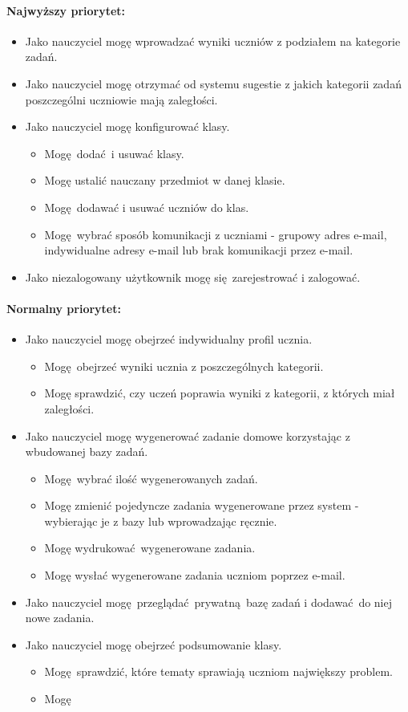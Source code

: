 \documentclass[polish,12pt]{aghthesis}
\begin{document}
\paragraph{Najwyższy priorytet:}
\begin{itemize}
	\item Jako nauczyciel mogę wprowadzać wyniki uczniów z podziałem na kategorie zadań.
	\item Jako nauczyciel mogę otrzymać od systemu sugestie z jakich kategorii zadań poszczególni uczniowie mają zaległości.
	\item Jako nauczyciel mogę konfigurować klasy.
	\begin{itemize}
		\item Mogę dodać i usuwać klasy.
		\item Mogę ustalić nauczany przedmiot w danej klasie.
		\item Mogę dodawać i usuwać uczniów do klas.
		\item Mogę wybrać sposób komunikacji z uczniami - grupowy adres e-mail, indywidualne adresy e-mail lub brak komunikacji przez e-mail.
	\end{itemize}
	\item Jako niezalogowany użytkownik mogę się zarejestrować i zalogować.
\end{itemize}

\paragraph{Normalny priorytet:}
\begin{itemize}
	\item Jako nauczyciel mogę obejrzeć indywidualny profil ucznia.
	\begin{itemize}
		\item Mogę obejrzeć wyniki ucznia z poszczególnych kategorii.
		\item Mogę sprawdzić, czy uczeń poprawia wyniki z kategorii, z których miał zaległości.
	\end{itemize}
	\item Jako nauczyciel mogę wygenerować zadanie domowe korzystając z wbudowanej bazy zadań.
	\begin{itemize}
		\item Mogę wybrać ilość wygenerowanych zadań.
		\item Mogę zmienić pojedyncze zadania wygenerowane przez system - wybierając je z bazy lub wprowadzając ręcznie. 
		\item Mogę wydrukować wygenerowane zadania.
		\item Mogę wysłać wygenerowane zadania uczniom poprzez e-mail.
	\end{itemize}
	\item Jako nauczyciel mogę przeglądać prywatną bazę zadań i dodawać do niej nowe zadania.
	\item Jako nauczyciel mogę obejrzeć podsumowanie klasy.
	\begin{itemize}
		\item Mogę sprawdzić, które tematy sprawiają uczniom największy problem.
		\item Mogę 
	\end{itemize}
\end{itemize}
\end{document}
